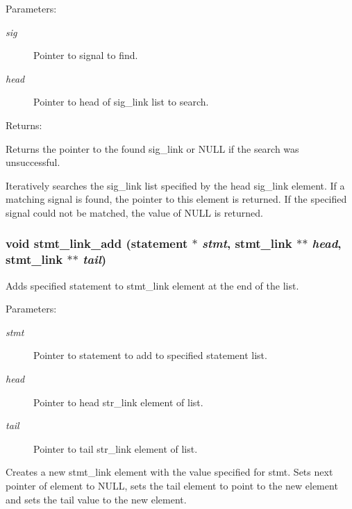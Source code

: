 \begin{Desc}
\item[Parameters: ]\par
\begin{description}
\item[{\em 
sig}]Pointer to signal to find. \item[{\em 
head}]Pointer to head of sig\_\-link list to search. \end{description}
\end{Desc}
\begin{Desc}
\item[Returns: ]\par
Returns the pointer to the found sig\_\-link or NULL if the search was unsuccessful.\end{Desc}
Iteratively searches the sig\_\-link list specified by the head sig\_\-link element. If a matching signal is found, the pointer to this element is returned. If the specified signal could not be matched, the value of NULL is returned. 
\subsubsection{\setlength{\rightskip}{0pt plus 5cm}void stmt\_\-link\_\-add ({\bf statement} $\ast$ {\em stmt}, {\bf stmt\_\-link} $\ast$$\ast$ {\em head}, {\bf stmt\_\-link} $\ast$$\ast$ {\em tail})}\label{link_8h_a1}


Adds specified statement to stmt\_\-link element at the end of the list.

\begin{Desc}
\item[Parameters: ]\par
\begin{description}
\item[{\em 
stmt}]Pointer to statement to add to specified statement list. \item[{\em 
head}]Pointer to head str\_\-link element of list. \item[{\em 
tail}]Pointer to tail str\_\-link element of list.\end{description}
\end{Desc}
Creates a new stmt\_\-link element with the value specified for stmt. Sets next pointer of element to NULL, sets the tail element to point to the new element and sets the tail value to the new element. 
